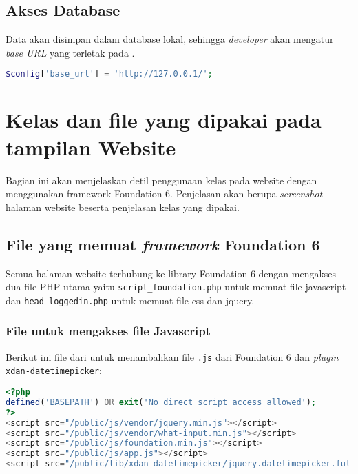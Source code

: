 \subsection{Akses Database}
Data akan disimpan dalam database lokal, sehingga \textit{developer} akan mengatur \textit{base URL} yang terletak pada . \\

\begin{lstlisting}[language=PHP, caption=Setting database lokal, label=Entri, basicstyle=\footnotesize\ttfamily, frame=single,
columns=fullflexible, keepspaces=true, breaklines=true, showstringspaces=false]
$config['base_url'] = 'http://127.0.0.1/';
\end{lstlisting}

\section{Kelas dan file yang dipakai pada tampilan Website}
Bagian ini akan menjelaskan detil penggunaan kelas pada website dengan menggunakan framework Foundation 6. Penjelasan akan berupa \textit{screenshot} halaman website beserta penjelasan kelas yang dipakai. \\

\subsection{File yang memuat \textit{framework} Foundation 6}
Semua halaman website terhubung ke library Foundation 6 dengan mengakses dua file PHP utama yaitu \texttt{script\_foundation.php} untuk memuat file javascript dan \texttt{head\_loggedin.php} untuk memuat file css dan jquery.\\


\subsubsection{File untuk mengakses file Javascript}
\noindent Berikut ini file dari  untuk menambahkan file \texttt{.js} dari Foundation 6 dan \textit{plugin} \texttt{xdan-datetimepicker}:
\begin{lstlisting}[language=PHP, caption=Penambahan library js, label=Entri, basicstyle=\footnotesize\ttfamily, frame=single,
columns=fullflexible, keepspaces=true, breaklines=true, showstringspaces=false]
<?php
defined('BASEPATH') OR exit('No direct script access allowed');
?>
<script src="/public/js/vendor/jquery.min.js"></script>
<script src="/public/js/vendor/what-input.min.js"></script>
<script src="/public/js/foundation.min.js"></script>
<script src="/public/js/app.js"></script>
<script src="/public/lib/xdan-datetimepicker/jquery.datetimepicker.full.min.js"></script>
\end{lstlisting}

